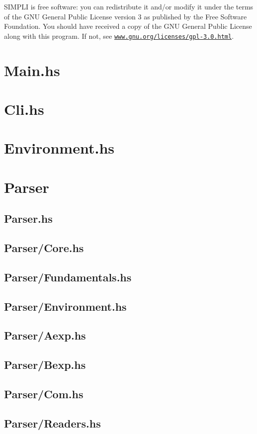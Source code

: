 \documentclass{esposito-documentation}
\begin{document}
SIMPLI is free software: you can redistribute it and/or modify it under the
terms of the GNU General Public License version 3 as published by the Free
Software Foundation. You should have received a copy of the GNU General Public
License along with this program. If not, see
\href{https://www.gnu.org/licenses/gpl-3.0.html}{\texttt{www.gnu.org/licenses/gpl-3.0.html}}.


\section{Main.hs}


\section{Cli.hs}


\section{Environment.hs}


\section{Parser}
\subsection{Parser.hs}


\subsection{Parser/Core.hs}


\subsection{Parser/Fundamentals.hs}


\subsection{Parser/Environment.hs}


\subsection{Parser/Aexp.hs}


\subsection{Parser/Bexp.hs}


\subsection{Parser/Com.hs}


\subsection{Parser/Readers.hs}


\backmatter
\printbibliography
\end{document}
